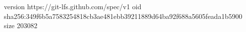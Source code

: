 version https://git-lfs.github.com/spec/v1
oid sha256:349f6b5a7583254818cb3ae481ebb39211889d64ba92f688a5605feada1b5900
size 203082

